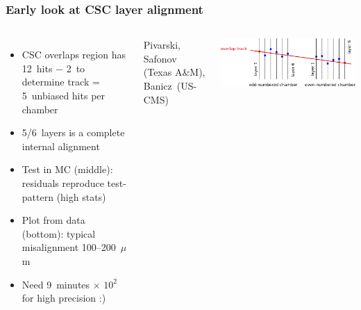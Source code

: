 \documentclass[compress]{beamer}
\begin{document}
\begin{frame}
\frametitle{Early look at CSC layer alignment}
\begin{columns}
\begin{itemize}
\item CSC overlaps region has 12~hits $-$ 2~to \mbox{determine\hspace{-0.5 cm}} track = 5~unbiased hits per chamber

\item 5/6~layers is a complete internal alignment

\item Test in MC (middle): residuals reproduce test-pattern {\scriptsize (high stats)}

\item Plot from data \mbox{(bottom):\hspace{-0.5 cm}} typical misalignment 100--200~$\mu$m

\item Need 9~minutes $\times$ $10^2$ for high precision  :)

\end{itemize}

\vspace{0.5 cm}
\tiny Pivarski, Safonov (Texas A\&M), \mbox{Banicz (US-CMS)\hspace{-1 cm}}

\vspace{0.5 cm}
\includegraphics[width=\linewidth]{layer_alignment_noskew.png}


\end{columns}
\end{frame}
\end{document}

